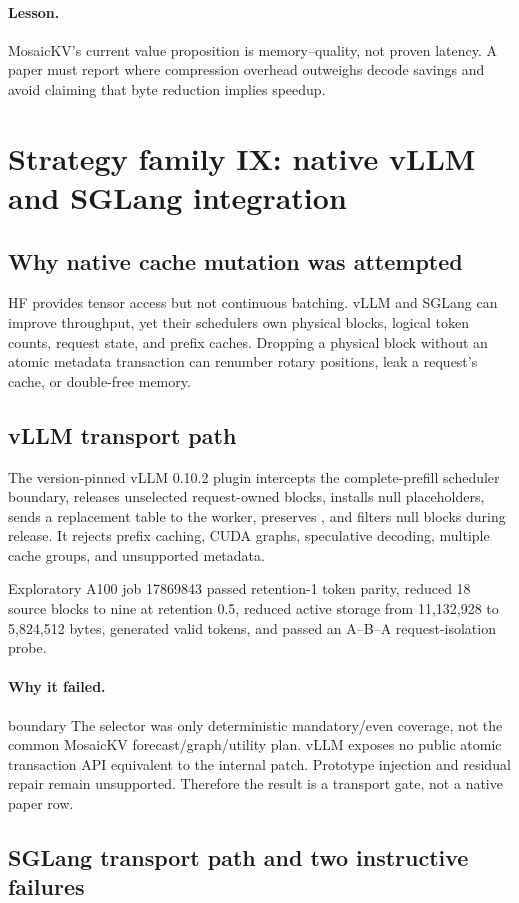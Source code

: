 \documentclass[11pt]{article}
\newcommand{\code}[1]{\texttt{\detokenize{#1}}}
\newcommand{\lesson}{\paragraph{Lesson.}}
\newcommand{\failure}{\paragraph{Why it failed.}}
\begin{document}
\lesson
MosaicKV's current value proposition is memory--quality, not proven latency.  A paper must report
where compression overhead outweighs decode savings and avoid claiming that byte reduction implies
speedup.

\section{Strategy family IX: native vLLM and SGLang integration}

\subsection{Why native cache mutation was attempted}

HF provides tensor access but not continuous batching.  vLLM and SGLang can improve throughput,
yet their schedulers own physical blocks, logical token counts, request state, and prefix caches.
Dropping a physical block without an atomic metadata transaction can renumber rotary positions,
leak a request's cache, or double-free memory.

\subsection{vLLM transport path}

The version-pinned vLLM 0.10.2 plugin intercepts the complete-prefill scheduler boundary, releases
unselected request-owned blocks, installs null placeholders, sends a replacement table to the
worker, preserves \code{num_computed_tokens}, and filters null blocks during release.  It rejects
prefix caching, CUDA graphs, speculative decoding, multiple cache groups, and unsupported metadata.

Exploratory A100 job 17869843 passed retention-1 token parity, reduced 18 source blocks to nine at
retention 0.5, reduced active storage from 11,132,928 to 5,824,512 bytes, generated valid tokens,
and passed an A--B--A request-isolation probe.

\failure boundary
The selector was only deterministic mandatory/even coverage, not the common MosaicKV
forecast/graph/utility plan.  vLLM exposes no public atomic transaction API equivalent to the
internal patch.  Prototype injection and residual repair remain unsupported.  Therefore the result
is a transport gate, not a native \code{mosaickv_exact} paper row.

\subsection{SGLang transport path and two instructive failures}
\end{document}
